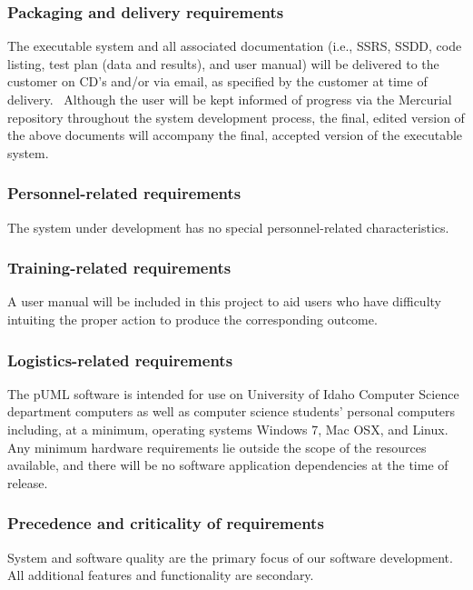 \documentclass[twoside,letterpaper]{article}
\begin{document}
\subsubsection[Packaging and delivery requirements]{\rmfamily\bfseries
Packaging and delivery requirements}
{
The executable system and all associated documentation (i.e., SSRS, SSDD, code listing, test plan (data and results), and user manual) will be delivered to the customer on CD{\textquoteright}s and/or via email, as
specified by the customer at time of delivery. \ Although the user will be kept informed of progress via the Mercurial repository throughout the
system development process, the final, edited version of the above
documents will accompany the final, accepted version of the executable
system.}

\subsubsection[Personnel{}-related requirements]{\rmfamily\bfseries
Personnel-related requirements}
{
The system under development has no special personnel-related
characteristics. }

\subsubsection[Training{}-related requirements]{\rmfamily\bfseries
Training-related requirements}
{
A user manual will be included in this project to aid users who have difficulty intuiting the proper action to produce the corresponding outcome.
}

\subsubsection[Logistics{}-related requirements]{\rmfamily\bfseries
Logistics-related requirements}
{
The pUML software is intended for use on University of Idaho Computer Science department computers as well as computer science students' personal computers including, at a minimum, operating systems Windows 7, Mac OSX, and Linux.
Any minimum hardware requirements lie outside the scope of the resources available,
and there will be no software application dependencies at the time of release.
}

\subsubsection[Precedence and criticality of requirements]{\rmfamily\bfseries
Precedence and criticality of requirements}
{
System and software quality are the primary focus of our software development. All additional features and functionality are secondary. 
}
\end{document}
